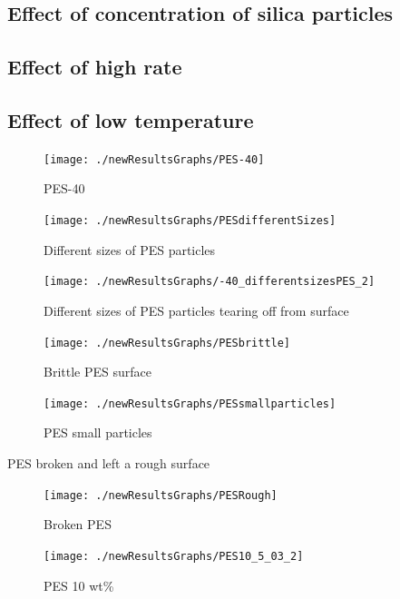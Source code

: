 \documentclass[numbers=noendperiod,chapterprefix=on]{icldt} %
\begin{document}
\subsection{Effect of concentration of silica particles}

\subsection{Effect of high rate}

\subsection{Effect of low temperature}

\begin{figure}[!hp]
\centering
\texttt{[image: ./newResultsGraphs/PES-40]}
\caption{PES-40} \label{PES-40}
\end{figure}
\FloatBarrier

\begin{figure}[!hp]
\centering
\texttt{[image: ./newResultsGraphs/PESdifferentSizes]}
\caption{Different sizes of PES particles} \label{differentsizesPES}
\end{figure}
\FloatBarrier

\begin{figure}[!hp]
\centering
\texttt{[image: ./newResultsGraphs/-40\_differentsizesPES\_2]}
\caption{Different sizes of PES particles tearing off from surface} \label{differentsizesPES_2}
\end{figure}
\FloatBarrier

\begin{figure}[!hp]
\centering
\texttt{[image: ./newResultsGraphs/PESbrittle]}
\caption{Brittle PES surface} \label{PESbrittle}
\end{figure}
\FloatBarrier

\begin{figure}[!hp]
\centering
\texttt{[image: ./newResultsGraphs/PESsmallparticles]}
\caption{PES small particles} \label{PESsmallparticles}
\end{figure}
\FloatBarrier

PES broken and left a rough surface

\begin{figure}[!hp]
\centering
\texttt{[image: ./newResultsGraphs/PESRough]}
\caption{Broken PES} \label{PESRough}
\end{figure}
\FloatBarrier

\begin{figure}[!hp]
\centering
\texttt{[image: ./newResultsGraphs/PES10\_5\_03\_2]}
\caption{PES 10 wt\%} \label{PES10_5_03_2}
\end{figure}
\FloatBarrier
\end{document}
